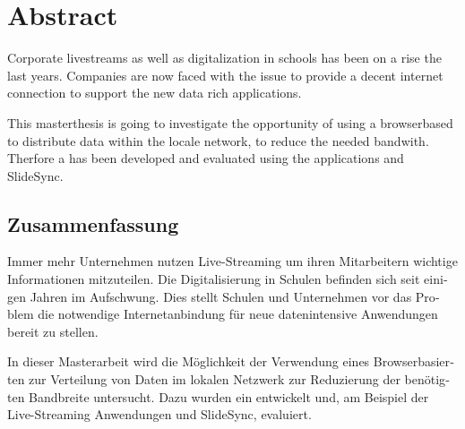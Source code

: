 \begingroup
\let\clearpage\relax
\let\cleardoublepage\relax
\let\cleardoublepage\relax

\chapter*{Abstract}

Corporate livestreams as well as digitalization in schools has been on a rise the last years. Companies are now faced with the issue to provide a decent internet connection to support the new data rich applications.

This masterthesis is going to investigate the opportunity of using a browserbased \pTp \cdn to distribute data within the locale network, to reduce the needed bandwith. Therfore a \pTp \cdn has been developed and evaluated using the applications \schulCloud and SlideSync.

\vfill

\begin{otherlanguage}{ngerman}
\chapter*{Zusammenfassung}
Immer mehr Unternehmen nutzen Live-Streaming um ihren Mitarbeitern wichtige Informationen mitzuteilen. Die Digitalisierung in Schulen befinden sich seit einigen Jahren im Aufschwung. Dies stellt Schulen und Unternehmen vor das Problem die notwendige Internetanbindung für neue datenintensive Anwendungen bereit zu stellen. 

In dieser Masterarbeit wird die Möglichkeit der Verwendung eines Browserbasierten \pTp \cdns zur Verteilung von Daten im lokalen Netzwerk zur Reduzierung der benötigten Bandbreite untersucht. Dazu wurden ein \pTp \cdn entwickelt und, am Beispiel der Live-Streaming Anwendungen \schulCloud und SlideSync, evaluiert.
\end{otherlanguage}

\endgroup			

\vfill